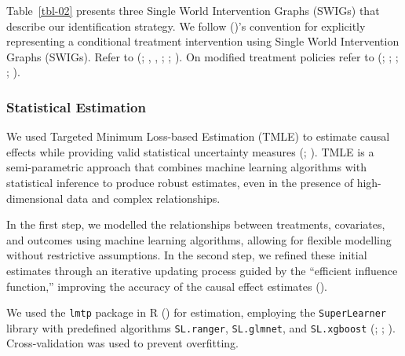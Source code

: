 \documentclass[
  single column]{article}
\begin{document}
Table~\ref{tbl-02} presents three Single World Intervention Graphs
(SWIGs) that describe our identification strategy. We follow
()'s
convention for explicitly representing a conditional treatment
intervention using Single World Intervention Graphs (SWIGs). Refer to
(;
,
,
;
;
). On
modified treatment policies refer to
(;
;
;
;
).

\subsubsection{Statistical Estimation}\label{statistical-estimation}

We used Targeted Minimum Loss-based Estimation (TMLE) to estimate causal
effects while providing valid statistical uncertainty measures
(;
). TMLE is a
semi-parametric approach that combines machine learning algorithms with
statistical inference to produce robust estimates, even in the presence
of high-dimensional data and complex relationships.

In the first step, we modelled the relationships between treatments,
covariates, and outcomes using machine learning algorithms, allowing for
flexible modelling without restrictive assumptions. In the second step,
we refined these initial estimates through an iterative updating process
guided by the ``efficient influence function,'' improving the accuracy
of the causal effect estimates ().

We used the \texttt{lmtp} package in R
() for estimation,
employing the \texttt{SuperLearner} library with predefined algorithms
\texttt{SL.ranger}, \texttt{SL.glmnet}, and \texttt{SL.xgboost}
(;
;
). Cross-validation
was used to prevent overfitting.
\end{document}
